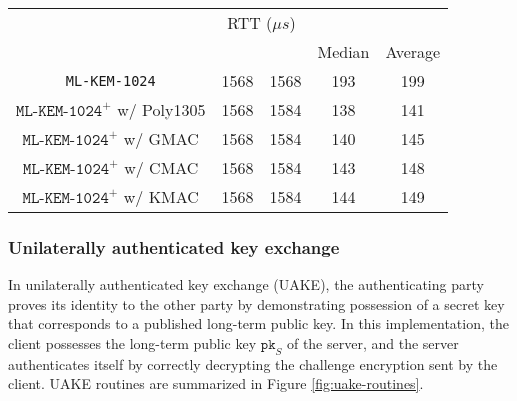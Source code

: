 \documentclass[journal=tches,submission]{iacrtrans}
\newcommand{\pk}{\texttt{pk}}
\newcommand{\us}{\mu s}
\begin{document}
\begin{table}[h]
\begin{tabular}{|c|c|c|c|c|}
        & \multicolumn{2}{|c|}{RTT ($\us$)} \\
        \cline{4-5}
        & & & Median & Average \\
        \hline
        \texttt{ML-KEM-1024} & 1568 & 1568 & 193 & 199 \\
        \hline
        $\texttt{ML-KEM-1024}^+$ w/ Poly1305 & 1568 & 1584 & 138 & 141 \\
        \hline
        $\texttt{ML-KEM-1024}^+$ w/ GMAC & 1568 & 1584 & 140 & 145 \\
        \hline
        $\texttt{ML-KEM-1024}^+$ w/ CMAC & 1568 & 1584 & 143 & 148 \\
        \hline
        $\texttt{ML-KEM-1024}^+$ w/ KMAC & 1568 & 1584 & 144 & 149 \\
        \hline
    \end{tabular}
\end{table}

\subsubsection{Unilaterally authenticated key exchange}\label{sec:uakex}
In unilaterally authenticated key exchange (UAKE), the authenticating party proves its identity to the other party by demonstrating possession of a secret key that corresponds to a published long-term public key. In this implementation, the client possesses the long-term public key $\pk_S$ of the server, and the server authenticates itself by correctly decrypting the challenge encryption sent by the client. UAKE routines are summarized in Figure \ref{fig:uake-routines}.
\end{document}
